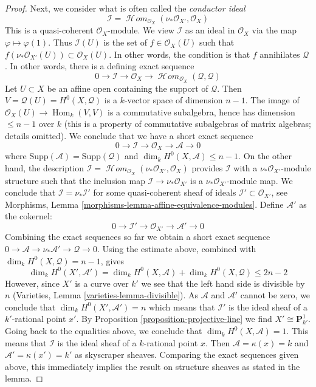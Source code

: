 \documentclass[10pt,a4paper]{amsart}
\theoremstyle{plain}
\theoremstyle{definition}
\theoremstyle{remark}
\numberwithin{equation}{subsection}
\def\Hom{\mathop{\mathrm{Hom}}\nolimits}
\def\SheafHom{\mathop{\mathcal{H}\!\mathit{om}}\nolimits}
\begin{document}
\begin{proof}
\medskip\noindent
Next, we consider what is often called the {\it conductor ideal}
$$
\mathcal{I} = \SheafHom_{\mathcal{O}_X}(\nu_*\mathcal{O}_{X'}, \mathcal{O}_X)
$$
This is a quasi-coherent $\mathcal{O}_X$-module. We view $\mathcal{I}$
as an ideal in $\mathcal{O}_X$ via the map $\varphi \mapsto \varphi(1)$.
Thus $\mathcal{I}(U)$ is the set of $f \in \mathcal{O}_X(U)$ such that
$f \left(\nu_*\mathcal{O}_{X'}(U)\right) \subset \mathcal{O}_X(U)$. In
other words, the condition is that $f$ annihilates $\mathcal{Q}$.
In other words, there is a defining exact sequence
$$
0 \to \mathcal{I} \to \mathcal{O}_X \to
\SheafHom_{\mathcal{O}_X}(\mathcal{Q}, \mathcal{Q})
$$
Let $U \subset X$ be an affine open containing the support of $\mathcal{Q}$.
Then $V = \mathcal{Q}(U) = H^0(X, \mathcal{Q})$ is a $k$-vector space
of dimension $n - 1$. The image of
$\mathcal{O}_X(U) \to \Hom_k(V, V)$ is a commutative subalgebra,
hence has dimension $\leq n - 1$ over $k$ (this is a property of
commutative subalgebras of matrix algebras; details omitted).
We conclude that we have a short exact sequence
$$
0 \to \mathcal{I} \to \mathcal{O}_X \to \mathcal{A} \to 0
$$
where $\text{Supp}(\mathcal{A}) = \text{Supp}(\mathcal{Q})$
and $\dim_k H^0(X, \mathcal{A}) \leq n - 1$.
On the other hand, the description
$\mathcal{I} = \SheafHom_{\mathcal{O}_X}(\nu_*\mathcal{O}_{X'}, \mathcal{O}_X)$
provides $\mathcal{I}$ with a $\nu_*\mathcal{O}_{X'}$-module structure
such that the inclusion map $\mathcal{I} \to \nu_*\mathcal{O}_{X'}$
is a $\nu_*\mathcal{O}_{X'}$-module map.
We conclude that $\mathcal{I} = \nu_*\mathcal{I}'$
for some quasi-coherent sheaf of ideals
$\mathcal{I}' \subset \mathcal{O}_{X'}$, see
Morphisms, Lemma \ref{morphisms-lemma-affine-equivalence-modules}.
Define $\mathcal{A}'$ as the cokernel:
$$
0 \to \mathcal{I}' \to \mathcal{O}_{X'} \to \mathcal{A}' \to 0
$$
Combining the exact sequences so far we obtain a short exact sequence
$0 \to \mathcal{A} \to \nu_*\mathcal{A}' \to \mathcal{Q} \to 0$.
Using the estimate above,
combined with $\dim_k H^0(X, \mathcal{Q}) = n - 1$, gives
$$
\dim_k H^0(X', \mathcal{A}') =
\dim_k H^0(X, \mathcal{A}) + \dim_k H^0(X, \mathcal{Q}) \leq 2 n - 2
$$
However, since $X'$ is a curve over $k'$ we see that
the left hand side is divisible by $n$
(Varieties, Lemma \ref{varieties-lemma-divisible}).
As $\mathcal{A}$ and $\mathcal{A}'$ cannot be zero, we conclude that
$\dim_k H^0(X', \mathcal{A}') = n$ which means that $\mathcal{I}'$
is the ideal sheaf of a $k'$-rational point $x'$.
By Proposition \ref{proposition-projective-line}
we find $X' \cong \mathbf{P}^1_{k'}$.
Going back to the equalities above, we conclude that
$\dim_k H^0(X, \mathcal{A}) = 1$. This
means that $\mathcal{I}$ is the ideal sheaf of a
$k$-rational point $x$. Then $\mathcal{A} = \kappa(x) = k$
and $\mathcal{A}' = \kappa(x') = k'$ as skyscraper sheaves.
Comparing the exact sequences given above,
this immediately implies the result on structure sheaves
as stated in the lemma.
\end{proof}
\end{document}
